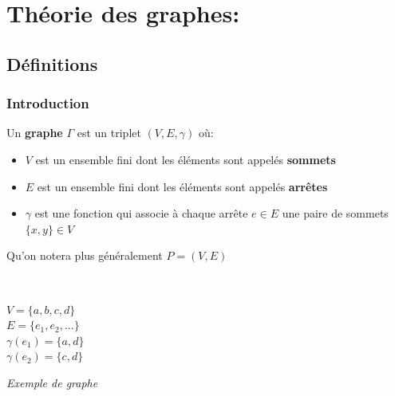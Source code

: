 \documentclass[11pt]{article}
\begin{document}
\section{Théorie des graphes:}
	\subsection{Définitions} 
		\subsubsection{Introduction}
	
			Un \textbf{graphe} $\Gamma$ est un triplet $(V,E,\gamma)$ où:
			\begin{itemize}
				\item $V$ est un ensemble fini dont les éléments sont appelés \textbf{sommets}
				\item $E$ est un ensemble fini dont les éléments sont appelés \textbf{arrêtes}
				\item $\gamma$ est une fonction qui associe à chaque arrête $e \in E$ une paire de sommets $\{x,y\} \in V$
			\end{itemize}
			Qu'on notera plus généralement $P=(V,E)$
			
			\begin{minipage}{0.5\textwidth}
			\center  
			 \\
			\end{minipage}\hfill
			\begin{minipage}{0.5\textwidth}
			\center
			$V = \{a,b,c,d\}$ \\
			$E = \{e_1, e_2, ...\}$ \\
			$\gamma(e_1)=\{a,d\}$ \\
			$\gamma(e_2)=\{c,d\}$\\
			\end{minipage}
			\begin{center}
			\textit{Exemple de graphe} \\
			\end{center}
\end{document}
